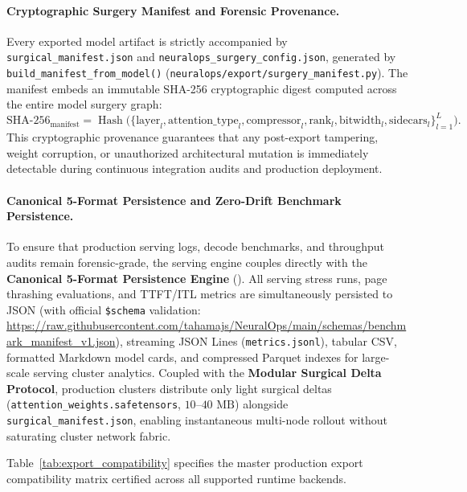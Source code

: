 \paragraph{Cryptographic Surgery Manifest and Forensic Provenance.}
Every exported model artifact is strictly accompanied by \texttt{surgical\_manifest.json} and \texttt{neuralops\_surgery\_config.json}, generated by \texttt{build\_manifest\_from\_model()} (\texttt{neuralops/export/surgery\_manifest.py}). The manifest embeds an immutable SHA-256 cryptographic digest computed across the entire model surgery graph:
\begin{equation}
\text{SHA-256}_{\text{manifest}} = \operatorname{Hash}\Big(\{\text{layer}_l, \text{attention\_type}_l, \text{compressor}_l, \text{rank}_l, \text{bitwidth}_l, \text{sidecars}_l\}_{l=1}^L\Big).
\end{equation}
This cryptographic provenance guarantees that any post-export tampering, weight corruption, or unauthorized architectural mutation is immediately detectable during continuous integration audits and production deployment.

\paragraph{Canonical 5-Format Persistence and Zero-Drift Benchmark Persistence.}
To ensure that production serving logs, decode benchmarks, and throughput audits remain forensic-grade, the serving engine couples directly with the \textbf{Canonical 5-Format Persistence Engine} (). All serving stress runs, page thrashing evaluations, and TTFT/ITL metrics are simultaneously persisted to JSON (with official \texttt{\$schema} validation: \url{https://raw.githubusercontent.com/tahamajs/NeuralOps/main/schemas/benchmark_manifest_v1.json}), streaming JSON Lines (\texttt{metrics.jsonl}), tabular CSV, formatted Markdown model cards, and compressed Parquet indexes for large-scale serving cluster analytics. Coupled with the \textbf{Modular Surgical Delta Protocol}, production clusters distribute only light surgical deltas (\texttt{attention\_weights.safetensors}, $10\text{--}40\text{ MB}$) alongside \texttt{surgical\_manifest.json}, enabling instantaneous multi-node rollout without saturating cluster network fabric.

Table~\ref{tab:export_compatibility} specifies the master production export compatibility matrix certified across all supported runtime backends.

